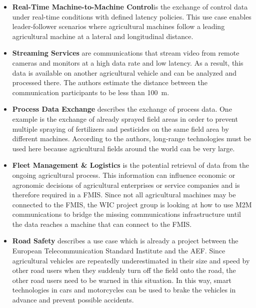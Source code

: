 \begin{itemize}
	\item \textbf{Real-Time Machine-to-Machine Control}is the exchange of control data under real-time conditions with defined latency policies. This use case enables leader-follower scenarios where agricultural machines follow a leading agricultural machine at a lateral and longitudinal distance. 
	\item \textbf{Streaming Services} are communications that stream video from remote cameras and monitors at a high data rate and low latency. As a result, this data is available on another agricultural vehicle and can be analyzed and processed there. The authors estimate the distance between the communication participants to be less than \SI{100}{\metre}. %
	\item \textbf{Process Data Exchange} describes the exchange of process data. One example is the exchange of already sprayed field areas in order to prevent multiple spraying of fertilizers and pesticides on the same field area by different machines. According to the authors, long-range technologies must be used here because agricultural fields around the world can be very large.
	\item \textbf{Fleet Management \& Logistics} is the potential retrieval of data from the ongoing agricultural process. This information can influence economic or agronomic decisions of agricultural enterprises or service companies and is therefore required in a \ac{FMIS}.
	Since not all agricultural machines may be connected to the \ac{FMIS}, the \ac{WIC} project group is looking at how to use \ac{M2M} communications to bridge the missing communications infrastructure until the data reaches a machine that can connect to the \ac{FMIS}.
	\item \textbf{Road Safety} describes a use case which is already a project between the European Telecommunication Standard 
	Institute and the \ac{AEF}. Since agricultural vehicles are repeatedly underestimated in their size and speed by other road users when they suddenly turn off the field onto the road, the other road users need to be warned in this situation. In this way, smart technologies in cars and motorcycles can be used to brake the vehicles in advance and prevent possible accidents.
\end{itemize}